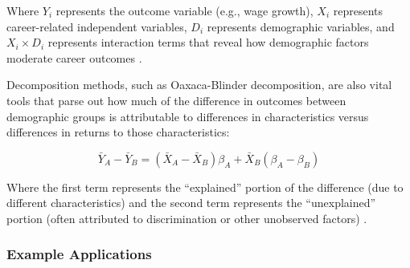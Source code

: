 \documentclass[../main.tex]{subfiles}
\begin{document}
Where $Y_i$ represents the outcome variable (e.g., wage growth), $X_i$ represents career-related independent variables, $D_i$ represents demographic variables, and $X_i \times D_i$ represents interaction terms that reveal how demographic factors moderate career outcomes \citep{dol2023building, baker2023demographic}.

Decomposition methods, such as Oaxaca-Blinder decomposition, are also vital tools that parse out how much of the difference in outcomes between demographic groups is attributable to differences in characteristics versus differences in returns to those characteristics:

\begin{equation}

\bar{Y}_A - \bar{Y}_B = (\bar{X}_A - \bar{X}_B)\beta_A + \bar{X}_B(\beta_A - \beta_B)

\end{equation}

Where the first term represents the ``explained'' portion of the difference (due to different characteristics) and the second term represents the ``unexplained'' portion (often attributed to discrimination or other unobserved factors) \citep{dol2023building, baker2023demographic}.

\subsubsection{Example Applications}
\end{document}
